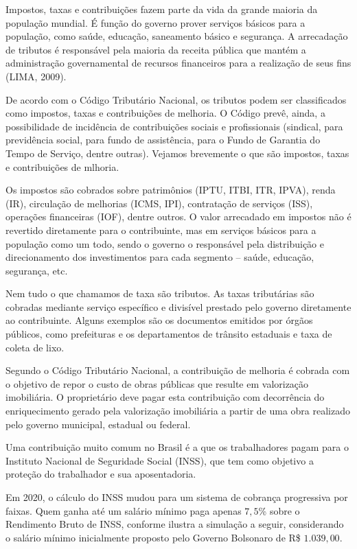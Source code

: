 \label{fin-arg-8}

Impostos, taxas e contribuições fazem parte da vida da grande maioria da população mundial. É função do governo prover serviços básicos para a população, como saúde, educação, saneamento básico e segurança. A arrecadação de tributos é responsável pela maioria da receita pública que mantém a administração governamental de recursos financeiros para a realização de seus fins (LIMA, 2009).

De acordo com o Código Tributário Nacional, os tributos podem ser classificados como impostos, taxas e contribuições de melhoria. O Código prevê, ainda, a possibilidade de incidência de contribuições sociais e profissionais (sindical, para previdência social, para fundo de assistência, para o Fundo de Garantia do Tempo de Serviço, dentre outras). Vejamos brevemente o que são impostos, taxas e contribuições de mlhoria.

Os impostos são cobrados sobre patrimônios (IPTU, ITBI, ITR, IPVA), renda (IR), circulação de melhorias (ICMS, IPI), contratação de serviços (ISS), operações financeiras (IOF), dentre outros. O valor arrecadado em impostos não é revertido diretamente para o contribuinte, mas em serviços básicos para a população como um todo, sendo o governo o responsável pela distribuição e direcionamento dos investimentos para cada segmento -- saúde, educação, segurança, etc.

Nem tudo o que chamamos de taxa são tributos. As taxas tributárias são cobradas mediante serviço específico e divisível prestado pelo governo diretamente ao contribuinte. Alguns exemplos são os documentos emitidos por órgãos públicos, como prefeituras e os departamentos de trânsito estaduais e taxa de coleta de lixo.

Segundo o Código Tributário Nacional, a contribuição de melhoria é cobrada com o objetivo de repor o custo de obras públicas que resulte em valorização imobiliária. O proprietário deve pagar esta contribuição com decorrência do enriquecimento gerado pela valorização imobiliária a partir de uma obra realizado pelo governo municipal, estadual ou federal.

Uma contribuição muito comum no Brasil é a que os trabalhadores pagam para o Instituto Nacional de Seguridade Social (INSS), que tem como objetivo a proteção do trabalhador e sua aposentadoria.

Em 2020, o cálculo do INSS mudou para um sistema de cobrança progressiva por faixas. Quem ganha até um salário mínimo paga apenas $7{,}5$\% sobre o Rendimento Bruto de INSS, conforme ilustra a simulação a seguir, considerando o salário mínimo inicialmente proposto pelo Governo Bolsonaro de R\$ $1.039{,}00$.

